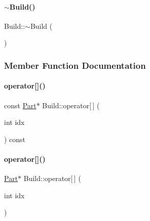 \paragraph{\texorpdfstring{$\sim$Build()}{~Build()}}
{\footnotesize\ttfamily Build\+::$\sim$\+Build (\begin{DoxyParamCaption}{ }\end{DoxyParamCaption})\hspace{0.3cm}{\ttfamily [inline]}}



\subsubsection{Member Function Documentation}
\mbox{\label{class_build_af3e03ed173016d7ff348d1e7057bd97c}} 
\paragraph{\texorpdfstring{operator[]()}{operator[]()}\hspace{0.1cm}{\footnotesize\ttfamily [1/2]}}
{\footnotesize\ttfamily const \mbox{\hyperlink{class_part}{Part}}$\ast$ Build\+::operator\mbox{[}$\,$\mbox{]} (\begin{DoxyParamCaption}\item[{int}]{idx }\end{DoxyParamCaption}) const\hspace{0.3cm}{\ttfamily [inline]}}

\mbox{\label{class_build_aa48e871d88c60272ab5f6cd5b97aaad0}} 
\paragraph{\texorpdfstring{operator[]()}{operator[]()}\hspace{0.1cm}{\footnotesize\ttfamily [2/2]}}
{\footnotesize\ttfamily \mbox{\hyperlink{class_part}{Part}}$\ast$ Build\+::operator\mbox{[}$\,$\mbox{]} (\begin{DoxyParamCaption}\item[{int}]{idx }\end{DoxyParamCaption})\hspace{0.3cm}{\ttfamily [inline]}}

\mbox{\label{class_build_aba0548391a8c613ed2a9d81d4d3b2a4b}} 
